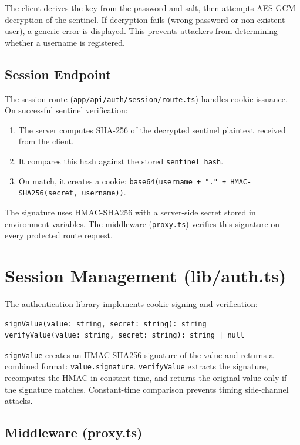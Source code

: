 The client derives the key from the password and salt, then attempts AES-GCM decryption of the sentinel. If decryption fails (wrong password or non-existent user), a generic error is displayed. This prevents attackers from determining whether a username is registered.

\subsection{Session Endpoint}

The session route (\texttt{app/api/auth/session/route.ts}) handles cookie issuance. On successful sentinel verification:
\begin{enumerate}
    \item The server computes SHA-256 of the decrypted sentinel plaintext received from the client.
    \item It compares this hash against the stored \texttt{sentinel\_hash}.
    \item On match, it creates a cookie: \texttt{base64(username + "." + HMAC-SHA256(secret, username))}.
\end{enumerate}

The signature uses HMAC-SHA256 with a server-side secret stored in environment variables. The middleware (\texttt{proxy.ts}) verifies this signature on every protected route request.

\section{Session Management (lib/auth.ts)}

The authentication library implements cookie signing and verification:

\begin{verbatim}
signValue(value: string, secret: string): string
verifyValue(value: string, secret: string): string | null
\end{verbatim}

\texttt{signValue} creates an HMAC-SHA256 signature of the value and returns a combined format: \texttt{value.signature}. \texttt{verifyValue} extracts the signature, recomputes the HMAC in constant time, and returns the original value only if the signature matches. Constant-time comparison prevents timing side-channel attacks.

\subsection{Middleware (proxy.ts)}

